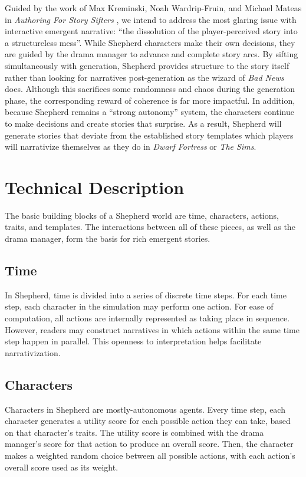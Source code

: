 \documentclass[letterpaper]{article}
\begin{document}
Guided by the work of Max Kreminski, Noah Wardrip-Fruin, and Michael Mateas in
\textit{Authoring For Story Sifters} \cite{kreminski:authoring}, we intend to address the
most glaring issue with interactive emergent narrative: “the dissolution of the
player-perceived story into a structureless mess”. While Shepherd characters make their
own decisions, they are guided by the drama manager to advance and complete story arcs. By
sifting simultaneously with generation, Shepherd provides structure to the story itself
rather than looking for narratives post-generation as the wizard of \textit{Bad News} does.
Although this sacrifices some randomness and chaos during the generation phase, the
corresponding reward of coherence is far more impactful. In addition, because Shepherd
remains a “strong autonomy” system, the characters continue to make decisions and create
stories that surprise. As a result, Shepherd will generate stories that deviate from the
established story templates which players will narrativize themselves as they do in
\textit{Dwarf Fortress} or \textit{The Sims}.

\section{Technical Description}
The basic building blocks of a Shepherd world are time, characters, actions, traits, and
templates. The interactions between all of these pieces, as well as the drama manager,
form the basis for rich emergent stories.

\subsection{Time}
In Shepherd, time is divided into a series of discrete time steps. For each time step,
each character in the simulation may perform one action. For ease of computation, all
actions are internally represented as taking place in sequence. However, readers may
construct narratives in which actions within the same time step happen in parallel. This
openness to interpretation helps facilitate narrativization.

\subsection{Characters}
Characters in Shepherd are mostly-autonomous agents. Every time step, each character
generates a utility score for each possible action they can take, based on that
character's traits. The utility score is combined with the drama manager's score for that
action to produce an overall score. Then, the character makes a weighted random choice
between all possible actions, with each action's overall score used as its weight.
\end{document}
